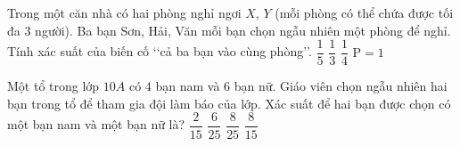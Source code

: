 

\begin{ex}%
	Trong một căn nhà có hai phòng nghỉ ngơi $X$, $Y$ (mỗi phòng có thể chứa được tối đa $3$ người). Ba bạn Sơn, Hải, Văn mỗi bạn  chọn ngẫu nhiên một phòng để nghỉ. Tính xác suất của biến cố \lq\lq cả ba bạn vào cùng phòng\rq\rq.
	 \choice
		 {$\dfrac{1}{5}$}
		{$\dfrac{1}{3}$} 
		{\True  $\dfrac{1}{4}$}
		 {$\mathrm{P}=1$}
\end{ex}

\begin{ex}%
	Một tổ trong lớp $10A$ có $4$ bạn nam  và $6$ bạn nữ. Giáo viên chọn ngẫu nhiên hai bạn trong tổ để tham gia đội làm báo của lớp. Xác suất để hai bạn được chọn có một bạn nam và một bạn nữ là?
	 \choice
		 {$\dfrac{2}{15}$}
		{$\dfrac{6}{25}$} 
		{$\dfrac{8}{25}$} 
		{\True  $\dfrac{8}{15}$}
\end{ex}

